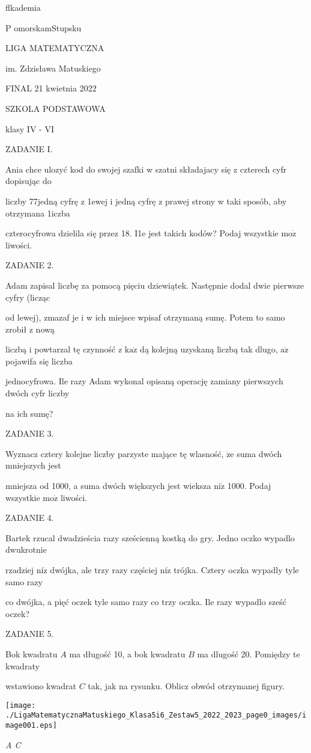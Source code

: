 \documentclass[a4paper,12pt]{article}
\begin{document}
flkademia

P omorskamStupsku

LIGA MATEMATYCZNA

im. Zdzisława Matuskiego

FINAL 21 kwietnia 2022

SZKOLA PODSTAWOWA

klasy IV - VI

ZADANIE I.

Ania chce ulozyć kod do swojej szafki w szatni składajacy się z czterech cyfr dopisując do

liczby 77jedną cyfrę z 1ewej i jedną cyfrę z prawej strony w taki sposób, aby otrzymana 1iczba

czterocyfrowa dzielila się przez 18. I1e jest takich kodów? Podaj wszystkie $\mathrm{m}\mathrm{o}\dot{\mathrm{z}}$ liwości.

ZADANIE 2.

Adam zapisal liczbę za pomocą pięciu dziewiątek. Następnie dodal dwie pierwsze cyfry (licząc

od lewej), zmazaf je i w ich miejsce wpisaf otrzymaną sumę. Potem to samo zrobił z nową

liczbą i powtarzal tę czynność z $\mathrm{k}\mathrm{a}\dot{\mathrm{z}}$ dą kolejną uzyskaną liczbą tak dlugo, $\mathrm{a}\dot{\mathrm{z}}$ pojawifa się liczba

jednocyfrowa. Ile razy Adam wykonal opisaną operację zamiany pierwszych dwóch cyfr liczby

na ich sumę?

ZADANIE 3.

Wyznacz cztery kolejne liczby parzyste mające tę wlasność, $\dot{\mathrm{z}}\mathrm{e}$ suma dwóch mniejszych jest

mniejsza od 1000, a suma dwóch większych jest wieksza $\mathrm{n}\mathrm{i}\dot{\mathrm{z}}$ 1000. Podaj wszystkie $\mathrm{m}\mathrm{o}\dot{\mathrm{z}}$ liwości.

ZADANIE 4.

Bartek rzucal dwadzieścia razy sześcienną kostką do gry. Jedno oczko wypadlo dwukrotnie

rzadziej $\mathrm{n}\mathrm{i}\dot{\mathrm{z}}$ dwójka, ale trzy razy częściej $\mathrm{n}\mathrm{i}\dot{\mathrm{z}}$ trójka. Cztery oczka wypadly tyle samo razy

co dwójka, a pięć oczek tyle samo razy co trzy oczka. Ile razy wypadlo sześć oczek?

ZADANIE 5.

Bok kwadratu $A$ ma długość 10, a bok kwadratu $B$ ma dlugość 20. Pomiędzy te kwadraty

wstawiono kwadrat $C$ tak, jak na rysunku. Oblicz obwód otrzymanej figury.
\begin{center}
\texttt{[image: ./LigaMatematycznaMatuskiego\_Klasa5i6\_Zestaw5\_2022\_2023\_page0\_images/image001.eps]}
\end{center}
{\it A  C}
\end{document}
